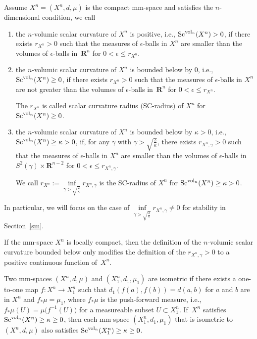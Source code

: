 \documentclass[pdftex]{sigma}
\begin{document}
\begin{Definition}
Assume $X^n=(X^n, d, \mu)$ is the compact mm-space and satisfies the $n$-dimensional condition, we call
\begin{enumerate}\itemsep=0pt
\item[$1.$] the $n$-volumic scalar curvature of $X^n$ is positive, i.e., ${\rm Sc}^{{\rm vol}_n}(X^n)> 0$, if there exists $r_{X^n} > 0$ such that the measures of $\epsilon$-balls in $X^n$ are smaller than the volumes of $\epsilon$-balls in~$\mathbf{R}^n$ for $0 < \epsilon \leq r_{X^n}$.
\item[$2.$] the $n$-volumic scalar curvature of $X^n$ is bounded below by 0, i.e., ${\rm Sc}^{{\rm vol}_n}(X^n)\geq 0$, if there exists $r_{X^n} > 0$ such that the measures of $\epsilon$-balls in $X^n$ are not greater than the volumes of $\epsilon$-balls in~$ \mathbf{R}^{n}$ for $0 < \epsilon \leq r_{X^n}$.

The $r_{X^n}$ is called scalar curvature radius $($SC-radius$)$ of $X^n$ for ${\rm Sc}^{{\rm vol}_n}(X^n)\geq 0$.

\item[$3.$] the $n$-volumic scalar curvature of $X^n$ is bounded below by $\kappa>0$, i.e., ${\rm Sc}^{{\rm vol}_n}(X^n)\geq\kappa>0$, if, for any $\gamma$ with $\gamma> \sqrt{\frac{2}{\kappa}}$, there exists $r_{X^n,\gamma} >0$ such that the measures of $\epsilon$-balls in $X^n$ are smaller than the volumes of $\epsilon$-balls in $S^2(\gamma)\times \mathbf{R}^{n-2}$ for $0 < \epsilon \leq r_{X^n,\gamma}$.

We call $r_{X^n}:=\inf\limits_{\gamma> \sqrt{\frac{2}{\kappa}}} r_{X^n,\gamma}$ is the SC-radius of $X^n$ for ${\rm Sc}^{{\rm vol}_n}(X^n)\geq\kappa>0$.
 \end{enumerate}
\end{Definition}

In particular, we will focus on the case of $\inf\limits_{\gamma> \sqrt{\frac{2}{\kappa}}} r_{X^n,\gamma}\neq 0$ for stability in Section~\ref{sm}.

If the mm-space $X^n$ is locally compact, then the definition of the $n$-volumic scalar curvature bounded below only modifies the definition of the $r_{X^n,\gamma} >0$ to a positive continuous function of~$X^n$.

Two mm-spaces $(X^n, d, \mu)$ and $(X^n_1, d_1, \mu_1)$ are isometric if there exists a one-to-one map $f\colon X^n \to X^n_1$ such that $d_1(f(a),f(b))=d(a,b)$ for $a$ and $b$ are in $X^n$ and $f_*\mu=\mu_1$, where $f_*\mu$ is the push-forward measure, i.e., $f_*\mu(U)=\mu\big(f^{-1}(U)\big)$ for a measureable subset $U\subset X^n_1$. If~$X^n$ satisfies ${\rm Sc}^{{\rm vol}_n}(X^n)\geq\kappa\geq 0$, then each mm-space $(X^n_1, d_1, \mu_1)$ that is isometric to $(X^n, d, \mu)$ also satisfies ${\rm Sc}^{{\rm vol}_n}(X^n_1)\geq\kappa\geq 0$.
\end{document}
